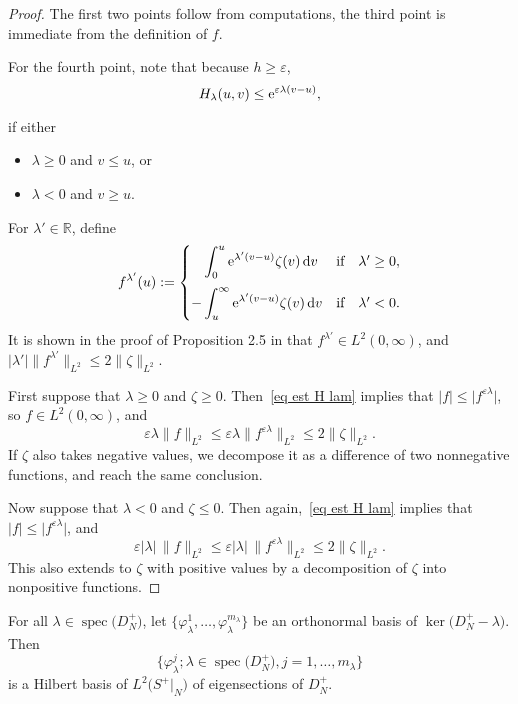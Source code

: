 \documentclass[pdftex]{sigma}%
\numberwithin{equation}{section}
\DeclareMathOperator{\spec}{spec}
\newcommand{\R}{\mathbb{R}}
\begin{document}
\begin{proof}
The first two points follow from computations, the third point is immediate from the definition of $f$.

For the fourth point, note that because $h \geq \varepsilon$,
\begin{equation} \label{eq est H lam}
H_{\lambda}(u, v) \leq {\rm e}^{\varepsilon \lambda(v-u)},
\end{equation}
{\samepage if either
\begin{itemize}\itemsep=0pt
\item $\lambda \geq 0$ and $v \leq u$, or
\item $\lambda<0$ and $v \geq u$.
\end{itemize}}
For $\lambda' \in \R$, define
\[
f^{\lambda'}(u) :=
\begin{cases}
\displaystyle\phantom{-}\int_0^u {\rm e}^{\lambda'(v-u)} \zeta(v)\, {\rm d}v & \text{if\quad $\lambda' \geq 0$},
\\[4mm]
\displaystyle-\int_u^{\infty} {\rm e}^{\lambda'(v-u)}\zeta(v)\, {\rm d}v & \text{if\quad $\lambda' <0$}.
\end{cases}
\]
 It is shown in the proof of Proposition 2.5 in \cite{APS1} that $f^{\lambda'} \in L^2(0,\infty)$, and $|\lambda'|\|f^{\lambda'}\|_{L^2}\leq 2\|\zeta\|_{L^2}$.

First suppose that $\lambda \geq 0$ and $\zeta \geq 0$.
Then~\eqref{eq est H lam} implies that $|f| \leq \big|f^{\varepsilon \lambda}\big|$, so $f\in L^2(0,\infty)$, and
\[
\varepsilon \lambda \|f\|_{L^2} \leq \varepsilon \lambda \big\|f^{\varepsilon \lambda}\big\|_{L^2} \leq 2\|\zeta\|_{L^2}.
\]
If $\zeta$ also takes negative values, we decompose it as a difference of two nonnegative functions, and reach the same conclusion.

Now suppose that $\lambda < 0$ and $\zeta \leq 0$. Then again,~\eqref{eq est H lam} implies that $|f| \leq \big|f^{\varepsilon \lambda}\big|$, and
\[
\varepsilon |\lambda|\, \|f\|_{L^2} \leq \varepsilon |\lambda|\, \big\|f^{\varepsilon \lambda}\big\|_{L^2} \leq 2\|\zeta\|_{L^2}.
\]
This also extends to $\zeta$ with positive values by a decomposition of $\zeta$ into nonpositive functions.
\end{proof}

For all $\lambda \in \spec\big(D_N^+\big)$, let $\big\{\varphi_{\lambda}^1, \dots, \varphi_{\lambda}^{m_{\lambda}} \big\}$ be an orthonormal basis of $\ker\big(D_N^+ - \lambda\big)$. Then
\begin{equation} \label{eq basis phi lam}
 \big\{\varphi_{\lambda}^j; {\lambda \in \spec\big(D_N^+\big)}, j=1, \dots, m_{\lambda} \big\}
 \end{equation}
 is a Hilbert basis of $L^2\big(S^+|_N\big)$ of eigensections of $D_N^+$.
\end{document}
